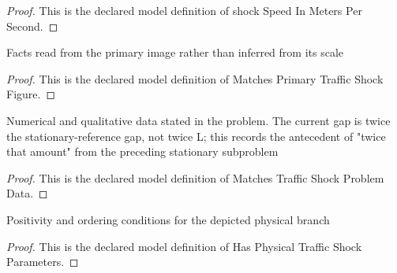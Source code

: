 \begin{proof}
  This is the declared model definition of shock Speed In Meters Per Second.
\end{proof}
\begin{definition}
  \label{def:physics:phyx-mini-0729:phyxminiproblems-problemphyxmini0729-matchesprimarytrafficshockfigure}
  Facts read from the primary image rather than inferred from its scale
\end{definition}
\begin{proof}
  This is the declared model definition of Matches Primary Traffic Shock Figure.
\end{proof}
\begin{definition}
  \label{def:physics:phyx-mini-0729:phyxminiproblems-problemphyxmini0729-matchestrafficshockproblemdata}
  Numerical and qualitative data stated in the problem. The current gap is twice the stationary-reference gap, not twice L; this records the antecedent of "twice that amount" from the preceding stationary subproblem
\end{definition}
\begin{proof}
  This is the declared model definition of Matches Traffic Shock Problem Data.
\end{proof}
\begin{definition}
  \label{def:physics:phyx-mini-0729:phyxminiproblems-problemphyxmini0729-hasphysicaltrafficshockparameters}
  Positivity and ordering conditions for the depicted physical branch
\end{definition}
\begin{proof}
  This is the declared model definition of Has Physical Traffic Shock Parameters.
\end{proof}
